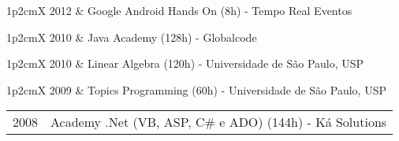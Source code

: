\documentclass[a4paper, oneside, final]{scrartcl}
\newcommand{\vspcitem}{\vspace{0.1cm}} %
\begin{document}
\begin{center}
\begin{tabularx}{1\linewidth}{p{2cm}X}
2012       & Google Android Hands On (8h) - Tempo Real Eventos \vspcitem\\
\end{tabularx}

\begin{tabularx}{1\linewidth}{p{2cm}X}
2010       & Java Academy (128h) - Globalcode \vspcitem\\
\end{tabularx}

\begin{tabularx}{1\linewidth}{p{2cm}X}
2010       & Linear Algebra (120h) - Universidade de São Paulo, USP \vspcitem\\
\end{tabularx}

\begin{tabularx}{1\linewidth}{p{2cm}X}
2009       & Topics Programming (60h) - Universidade de São Paulo, USP \vspcitem\\
\end{tabularx}

\begin{tabularx}{1\linewidth}{p{2cm}X}
2008       & Academy .Net (VB, ASP, C\# e ADO) (144h) - Ká Solutions
\end{tabularx}


\end{center}
\end{document}
